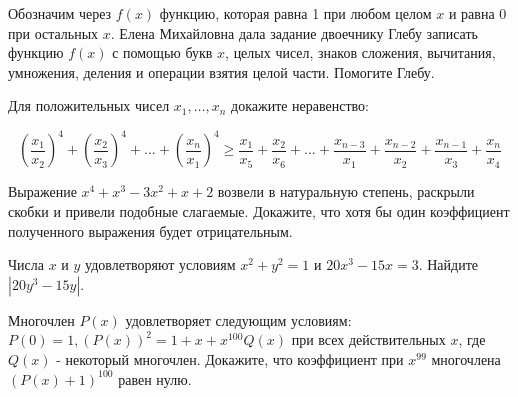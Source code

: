 Обозначим через $f(x)$ функцию, которая равна 1 при любом целом $x$ и равна 0 при остальных $x$. Елена Михайловна дала задание двоечнику Глебу записать функцию $f(x)$ с помощью букв $x$, целых чисел, знаков сложения, вычитания, умножения, деления и операции взятия целой части. Помогите Глебу.

Для положительных чисел $x_1, \ldots, x_n$ докажите неравенство:

$$
\left(\frac{x_1}{x_2}\right)^4+\left(\frac{x_2}{x_3}\right)^4+\ldots+\left(\frac{x_n}{x_1}\right)^4 \geqslant \frac{x_1}{x_5}+\frac{x_2}{x_6}+\ldots+\frac{x_{n-3}}{x_1}+\frac{x_{n-2}}{x_2}+\frac{x_{n-1}}{x_3}+\frac{x_n}{x_4}
$$

Выражение $x^4+x^3-3 x^2+x+2$ возвели в натуральную степень, раскрыли скобки и привели подобные слагаемые. Докажите, что хотя бы один коэффициент полученного выражения будет отрицательным.

 
Числа $x$ и $y$ удовлетворяют условиям $x^2+y^2=1$ и $20 x^3-15 x=3$. Найдите $\left|20 y^3-15 y\right|$.

Многочлен $P(x)$ удовлетворяет следующим условиям: $P(0)=1,(P(x))^2=1+x+x^{100} Q(x)$ при всех действительных $x$, где $Q(x)$ - некоторый многочлен. Докажите, что коэффициент при $x^{99}$ многочлена $(P(x)+1)^{100}$ равен нулю.